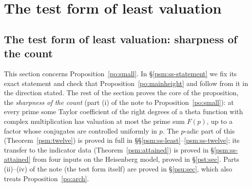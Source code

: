 \documentclass[10pt]{amsart}
\theoremstyle{definition}
\theoremstyle{remark}
\newcommand{\C}{\mathbb C}
\providecommand{\ancl}{\mathrm{cl}}
\providecommand{\psvac}{\mathbf v}
\begin{document}
\section{The test form of least valuation}\label{C2:g6}
\providecommand{\auO}{\mathcal O}
\providecommand{\auU}{\mathrm U}
\providecommand{\auAut}{\operatorname{Aut}}
\providecommand{\auNm}{\operatorname{Nm}}
\providecommand{\auA}{\mathbb A}
\providecommand{\auPl}{\Phi}
\providecommand{\auPa}{\Phi_a}
\providecommand{\auPb}{\Phi_b}
\providecommand{\aubud}{\mathrm{bud}}
\providecommand{\auhdir}{h_{\mathrm{dir}}}
\providecommand{\ausinf}{s_\infty}
\providecommand{\ausfin}{s_{\mathrm{fin}}}
\providecommand{\aubar}[1]{\overline{#1}}
\providecommand{\pao}{\mathfrak o}
\providecommand{\pam}{\mathfrak m}
\providecommand{\paCp}{\C_p}
\providecommand{\popr}{\operatorname{pr}}
\providecommand{\psvac}{\mathbf v}
\providecommand{\psrho}{\varrho}
\providecommand{\ancl}{\operatorname{cl}}
\providecommand{\psmval}{\operatorname{val}}
\providecommand{\psmR}{R}
\providecommand{\psmns}{n_\sharp}
\providecommand{\psmpr}{\mathrm{pr}}
\providecommand{\psmnot}[1]{\par\smallskip{\raggedright\noindent\textbf{[Not proved here:} #1\textbf{]}\par}\smallskip}

\subsection{The test form of least valuation: sharpness of the count}\label{psm:sec}

This section concerns Proposition~\ref{po:small}. In \S\ref{psm:ss-statement} we fix its exact
statement and check that Proposition~\ref{po:mainheight} and {\cite[Proposition~14.42]{P46}} follow from
it in the direction stated. The rest of the section proves the core of the proposition, the
\emph{sharpness of the count} (part (i) of the note to Proposition~\ref{po:small}): at every prime
some Taylor coefficient of the right degrees of a theta function with complex multiplication has
valuation at most the prime sum $F(p)$, up to a factor whose conjugates are controlled uniformly
in $p$. The $p$-adic part of this (Theorem~\ref{psm:twelve}) is proved in full in
\S\S\ref{psm:ss-least}--\ref{psm:ss-twelve}; its transfer to the indicator data
(Theorem~\ref{psm:attained}) is proved in \S\ref{psm:ss-attained} from four inputs on the
Heisenberg model, proved in \S\ref{pst:sec}. Parts (ii)--(iv) of the note (the test form itself)
are proved in \S\ref{psu:sec}, which also treats Proposition~\ref{po:arch}.
\end{document}
